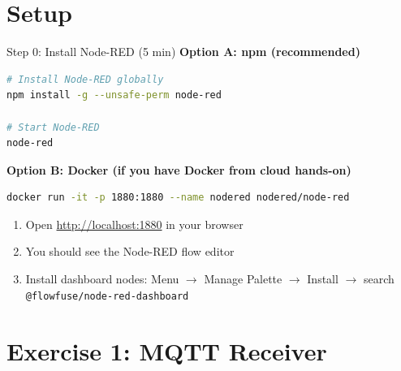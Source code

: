 \documentclass[aspectratio=169,11pt]{beamer}
\begin{document}
\section{Setup}

\begin{frame}[fragile]{Step 0: Install Node-RED (5 min)}
    \textbf{Option A: npm (recommended)}
    \begin{lstlisting}[language=bash]
# Install Node-RED globally
npm install -g --unsafe-perm node-red

# Start Node-RED
node-red
    \end{lstlisting}

    \textbf{Option B: Docker (if you have Docker from cloud hands-on)}
    \begin{lstlisting}[language=bash]
docker run -it -p 1880:1880 --name nodered nodered/node-red
    \end{lstlisting}

    \vspace{0.2cm}
    \begin{enumerate}
        \item Open \url{http://localhost:1880} in your browser
        \item You should see the Node-RED flow editor
        \item Install dashboard nodes: Menu $\rightarrow$ Manage Palette $\rightarrow$ Install $\rightarrow$ search \texttt{@flowfuse/node-red-dashboard}
    \end{enumerate}

    \vspace{0.1cm}
\end{frame}

\section{Exercise 1: MQTT Receiver}
\end{document}
